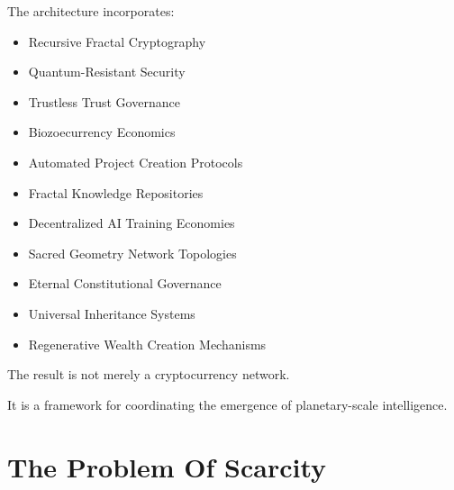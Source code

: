 ﻿\documentclass[12pt]{article}
\begin{document}
The architecture incorporates:

\begin{itemize}
  \item Recursive Fractal Cryptography
\end{itemize}
\begin{itemize}
  \item Quantum-Resistant Security
\end{itemize}
\begin{itemize}
  \item Trustless Trust Governance
\end{itemize}
\begin{itemize}
  \item Biozoecurrency Economics
\end{itemize}
\begin{itemize}
  \item Automated Project Creation Protocols
\end{itemize}
\begin{itemize}
  \item Fractal Knowledge Repositories
\end{itemize}
\begin{itemize}
  \item Decentralized AI Training Economies
\end{itemize}
\begin{itemize}
  \item Sacred Geometry Network Topologies
\end{itemize}
\begin{itemize}
  \item Eternal Constitutional Governance
\end{itemize}
\begin{itemize}
  \item Universal Inheritance Systems
\end{itemize}
\begin{itemize}
  \item Regenerative Wealth Creation Mechanisms
\end{itemize}

The result is not merely a cryptocurrency network.

It is a framework for coordinating the emergence of planetary-scale intelligence.

\section{The Problem Of Scarcity}
\end{document}
